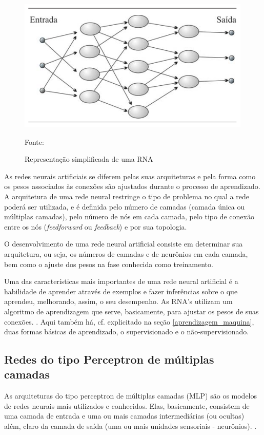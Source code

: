 \begin{figure}[h!]
	\centering
	\includegraphics[width=.7\textwidth]{imagens/RNA.png}	
	\caption{Representação simplificada de uma RNA}
	{\scriptsize 	Fonte: \cite[p.26]{ferneda_redes_2006}}
	\label{fig:rna}
\end{figure}

As  redes  neurais  artificiais  se  diferem  pelas  suas arquiteturas e pela forma como os pesos associados às conexões são ajustados durante o processo de aprendizado.	A arquitetura de uma rede neural restringe o tipo de problema no qual a rede poderá ser utilizada, e é definida pelo  número  de  camadas  (camada única  ou múltiplas camadas), pelo número de nós em cada camada, pelo tipo de conexão entre os nós (\textit{feedforward} ou \textit{feedback}) e por sua topologia. \cite[p. 46-49]{haykin_redes_2001}

O desenvolvimento de uma rede neural artificial consiste em determinar sua arquitetura, ou seja, os números de camadas e de neurônios em cada camada, bem como o ajuste dos pesos na fase conhecida como treinamento.\cite{hagan_neural_1996} \cite{haykin_redes_2001}

Uma das características mais importantes de uma rede neural artificial é a habilidade de aprender através de exemplos e fazer inferências sobre o que aprendeu, melhorando, assim, o seu desempenho. As RNA's utilizam um algoritmo de aprendizagem que serve, basicamente, para ajustar os pesos de suas conexões. \cite{haykin_redes_2001} \cite{ferneda_redes_2006} \cite{lima_ia_2016} \cite{Norvig2013}. Aqui também há, cf. explicitado na seção \ref{aprendizagem_maquina}, duas formas básicas de aprendizado, o supervisionado e o não-supervisionado.

\subsection{Redes do tipo Perceptron de múltiplas camadas}
As arquiteturas do tipo perceptron de múltiplas camadas (MLP) são os modelos de redes neurais mais utilizados e conhecidos. Elas, basicamente, consistem de uma camada de entrada e uma ou mais camadas intermediárias (ou ocultas) além, claro da camada de saída (uma ou mais unidades sensoriais - neurônios). \cite{haykin_redes_2001}.

